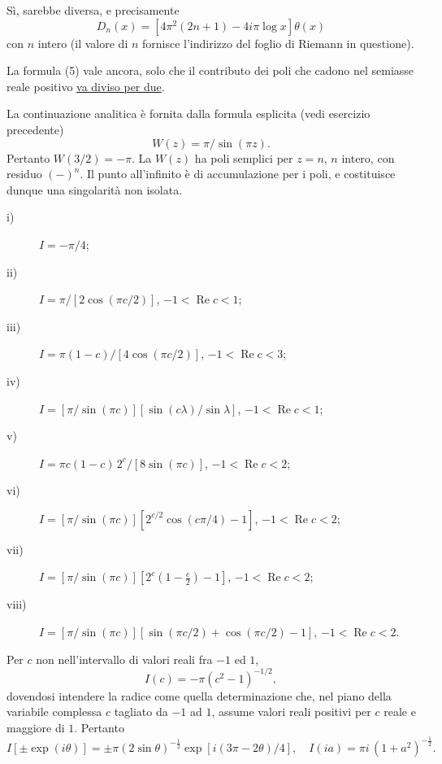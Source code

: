 \documentclass[11pt, a4paper]{book}
\numberwithin{equation}{section}
\begin{document}
\begin{description}
Sì, sarebbe diversa, e precisamente
$$D_n(x) = \left[4\pi^2(2n+1) - 4i\pi\log x\right]\theta(x)$$
con $n$ intero (il valore di $n$ fornisce l'indirizzo del foglio di Riemann in questione).

\item[10-1] La formula (5) vale ancora, solo che il contributo dei poli che cadono nel semiasse reale positivo \underline{va diviso per due}.

\item[10-3] La continuazione analitica è fornita dalla formula esplicita (vedi esercizio precedente)
$$W(z) = \pi/\sin(\pi z).$$
Pertanto $W(3/2) = -\pi$. La $W(z)$ ha poli semplici per $z = n$, $n$ intero, con residuo $(-)^n$. Il punto all'infinito è di accumulazione per i poli, e costituisce dunque una singolarità non isolata.

\item[10-5] 
\begin{description}
\item[i)] $I = -\pi/4$;
\item[ii)] $I = \pi/\left[2\cos(\pi c/2)\right]$, \quad $-1 < \operatorname{Re} c < 1$;
\item[iii)] $I = \pi(1-c)/\left[4\cos(\pi c/2)\right]$, \quad $-1 < \operatorname{Re} c < 3$;
\item[iv)] $I = \left[\pi/\sin(\pi c)\right]\left[\sin(c\lambda)/\sin\lambda\right]$, \quad $-1 < \operatorname{Re} c < 1$;
\item[v)] $I = \pi c(1-c)\,2^c/\left[8\sin(\pi c)\right]$, \quad $-1 < \operatorname{Re} c < 2$;
\item[vi)] $I = \left[\pi/\sin(\pi c)\right]\left[2^{c/2}\cos(c\pi/4) - 1\right]$, \quad $-1 < \operatorname{Re} c < 2$;
\item[vii)] $I = \left[\pi/\sin(\pi c)\right]\left[2^c\left(1 - \tfrac{c}{2}\right) - 1\right]$, \quad $-1 < \operatorname{Re} c < 2$;
\item[viii)] $I = \left[\pi/\sin(\pi c)\right]\left[\sin(\pi c/2) + \cos(\pi c/2) - 1\right]$, \quad $-1 < \operatorname{Re} c < 2$.
\end{description}

\item[10-6] Per $c$ non nell'intervallo di valori reali fra $-1$ ed $1$,
$$I(c) = -\pi(c^2-1)^{-1/2},$$
dovendosi intendere la radice come quella determinazione che, nel piano della variabile complessa $c$ tagliato da $-1$ ad $1$, assume valori reali positivi per $c$ reale e maggiore di $1$. Pertanto
$$I\left[\pm\exp(i\theta)\right] = \pm\pi(2\sin\theta)^{-\frac{1}{2}}\exp\left[i(3\pi-2\theta)/4\right], \quad I(ia) = \pi i\,(1+a^2)^{-\frac{1}{2}}.$$


\end{description}
\end{document}
